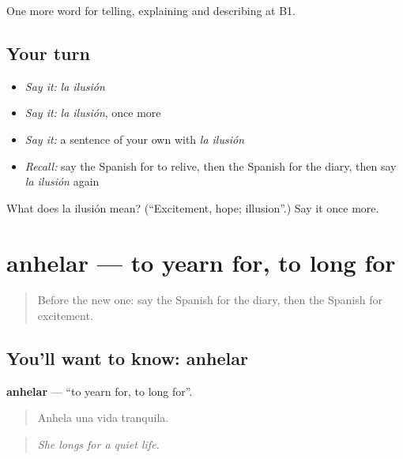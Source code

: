 \begin{grammarlens}[title={What you've built}]
One more word for telling, explaining and describing at B1.
\end{grammarlens}

\subsection*{Your turn}
\begin{itemize}
\raggedright
  \item \emph{Say it:} \emph{la ilusión}
  \item \emph{Say it:} \emph{la ilusión}, once more
  \item \emph{Say it:} a sentence of your own with \emph{la ilusión}
  \item \emph{Recall:} say the Spanish for to relive, then the Spanish for the diary, then say \emph{la ilusión} again
\end{itemize}

\begin{tcolorbox}[breakable,colback=teal!4,colframe=teal!35!black,title={Before you move on}]
What does la ilusión mean? (\textquotedblleft{}Excitement, hope; illusion\textquotedblright{}.) Say it once more.
\end{tcolorbox}
\section[anhelar]{anhelar — to yearn for, to long for}

\label{lesson:ES-C765-anhelar}



\begin{quote}
Before the new one: say the Spanish for the diary, then the Spanish for excitement.
\end{quote}

\subsection*{You'll want to know: anhelar}
\textbf{anhelar} — \textquotedblleft{}to yearn for, to long for\textquotedblright{}.

\begin{quote}
Anhela una vida tranquila.
\end{quote}

\begin{quote}
\emph{She longs for a quiet life.}
\end{quote}

